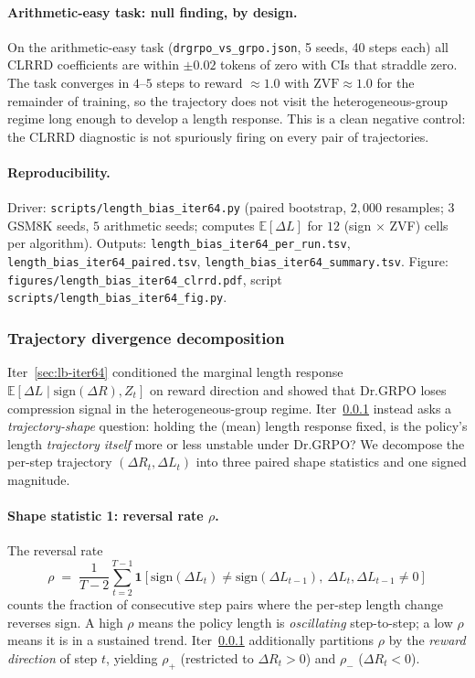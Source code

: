 \documentclass{article}
\begin{document}
\paragraph{Arithmetic-easy task: null finding, by design.}
On the arithmetic-easy task (\texttt{drgrpo\_vs\_grpo.json}, 5 seeds,
40 steps each) all CLRRD coefficients are within $\pm 0.02$ tokens of
zero with CIs that straddle zero. The task converges in $4$--$5$ steps
to reward $\approx 1.0$ with $\mathrm{ZVF} \approx 1.0$ for the
remainder of training, so the trajectory does not visit the
heterogeneous-group regime long enough to develop a length response.
This is a clean negative control: the CLRRD diagnostic is not
spuriously firing on every pair of trajectories.

\paragraph{Reproducibility.}
Driver: \texttt{scripts/length\_bias\_iter64.py} (paired bootstrap,
$2{,}000$ resamples; $3$ GSM8K seeds, $5$ arithmetic seeds; computes
$\mathbb{E}[\Delta L]$ for $12$ (sign $\times$ ZVF) cells per
algorithm). Outputs: \texttt{length\_bias\_iter64\_per\_run.tsv},
\texttt{length\_bias\_iter64\_paired.tsv},
\texttt{length\_bias\_iter64\_summary.tsv}. Figure:
\texttt{figures/length\_bias\_iter64\_clrrd.pdf}, script
\texttt{scripts/length\_bias\_iter64\_fig.py}. 

\subsubsection{Trajectory divergence decomposition}\label{sec:lb-iter68}

Iter~\ref{sec:lb-iter64} conditioned the marginal length response
$\mathbb{E}[\Delta L \mid \mathrm{sign}(\Delta R), Z_t]$ on reward direction
and showed that Dr.GRPO loses compression signal in the
heterogeneous-group regime. Iter~\ref{sec:lb-iter68} instead asks a
\emph{trajectory-shape} question: holding the (mean) length response
fixed, is the policy's length \emph{trajectory itself} more or less
unstable under Dr.GRPO? We decompose the per-step trajectory
$(\Delta R_t, \Delta L_t)$ into three paired shape statistics and one
signed magnitude.

\paragraph{Shape statistic 1: reversal rate $\rho$.}
The reversal rate
\begin{equation}\label{eq:lb68-rho}
\rho \;=\; \frac{1}{T-2}\sum_{t=2}^{T-1}
\mathbf{1}\!\left[\mathrm{sign}(\Delta L_t) \neq \mathrm{sign}(\Delta L_{t-1}),\ \Delta L_t, \Delta L_{t-1} \neq 0\right]
\end{equation}
counts the fraction of consecutive step pairs where the per-step length
change reverses sign. A high $\rho$ means the policy length is
\emph{oscillating} step-to-step; a low $\rho$ means it is in a sustained
trend. Iter~\ref{sec:lb-iter68} additionally partitions $\rho$ by the
\emph{reward direction} of step $t$, yielding $\rho_{+}$ (restricted to
$\Delta R_t > 0$) and $\rho_{-}$ ($\Delta R_t < 0$).
\end{document}
